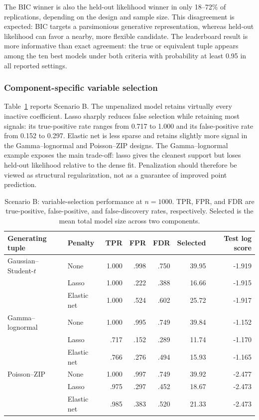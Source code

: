 \documentclass[11pt]{article}
\begin{document}
The BIC winner is also the held-out likelihood winner in only 18--72\% of
replications, depending on the design and sample size.  This disagreement is
expected: BIC targets a parsimonious generative representation, whereas
held-out likelihood can favor a nearby, more flexible candidate.  The
leaderboard result is more informative than exact agreement: the true or
equivalent tuple appears among the ten best models under both criteria with
probability at least 0.95 in all reported settings.

\subsubsection{Component-specific variable selection}

Table~\ref{tab:variable_selection} reports Scenario B.  The unpenalized model
retains virtually every inactive coefficient.  Lasso sharply reduces false
selection while retaining most signals: its true-positive rate ranges from
0.717 to 1.000 and its false-positive rate from 0.152 to 0.297.  Elastic net is
less sparse and retains slightly more signal in the Gamma--lognormal and
Poisson--ZIP designs.  The Gamma--lognormal example exposes the main trade-off:
lasso gives the cleanest support but loses held-out likelihood relative to the
dense fit.  Penalization should therefore be viewed as structural
regularization, not as a guarantee of improved point prediction.

\begin{table}[t]
\centering
\caption{Scenario B: variable-selection performance at \(n=1000\).  TPR,
FPR, and FDR are true-positive, false-positive, and false-discovery rates,
respectively.
Selected is the mean total model size across two components.}
\label{tab:variable_selection}
\small
\begin{tabular}{llrrrrr}
\toprule
Generating tuple & Penalty & TPR & FPR & FDR & Selected & Test log score \\
\midrule
Gaussian--Student-\(t\) & None & 1.000 & .998 & .750 & 39.95 & -1.919 \\
 & Lasso & 1.000 & .222 & .388 & 16.66 & -1.915 \\
 & Elastic net & 1.000 & .524 & .602 & 25.72 & -1.917 \\
Gamma--lognormal & None & 1.000 & .995 & .749 & 39.84 & -1.152 \\
 & Lasso & .717 & .152 & .289 & 11.74 & -1.170 \\
 & Elastic net & .766 & .276 & .494 & 15.93 & -1.165 \\
Poisson--ZIP & None & 1.000 & .997 & .749 & 39.92 & -2.477 \\
 & Lasso & .975 & .297 & .452 & 18.67 & -2.473 \\
 & Elastic net & .985 & .383 & .520 & 21.33 & -2.473 \\
\bottomrule
\end{tabular}
\end{table}
\end{document}
